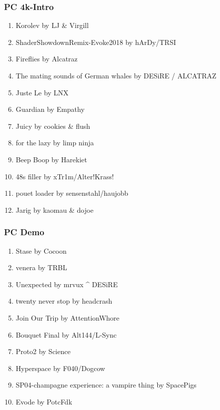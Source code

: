 \documentclass{beamer}
\begin{document}
\begin{frame}
  \frametitle{PC 4k-Intro}
  \begin{enumerate}
  \item Korolev by LJ \& Virgill
  \item ShaderShowdownRemix-Evoke2018 by hArDy/TRSI
  \item Fireflies by Alcatraz
  \item The mating sounds of German whales by DESiRE / ALCATRAZ
  \item Juste Le by LNX
  \item Guardian by Empathy
  \item Juicy by cookies \& flush
  \item for the lazy by limp ninja
  \item Beep Boop by Harekiet
  \item 48s filler by xTr1m/Alter!Krass!
  \item pouet loader by sensenstahl/haujobb
  \item Jarig by kaomau \& dojoe
  \end{enumerate}
\end{frame}

\begin{frame}
  \frametitle{PC Demo}
  \begin{enumerate}
  \item Stase by Cocoon
  \item venera by TRBL
  \item Unexpected by mrvux \^{} DESiRE
  \item twenty never stop by headcrash
  \item Join Our Trip by AttentionWhore
  \item Bouquet Final by Alt144/L-Sync
  \item Proto2 by Science
  \item Hyperspace by F040/Dogcow
  \item SP04-champagne experience: a vampire thing by SpacePigs
  \item Evode by PotcFdk
  \end{enumerate}
\end{frame}
\end{document}
